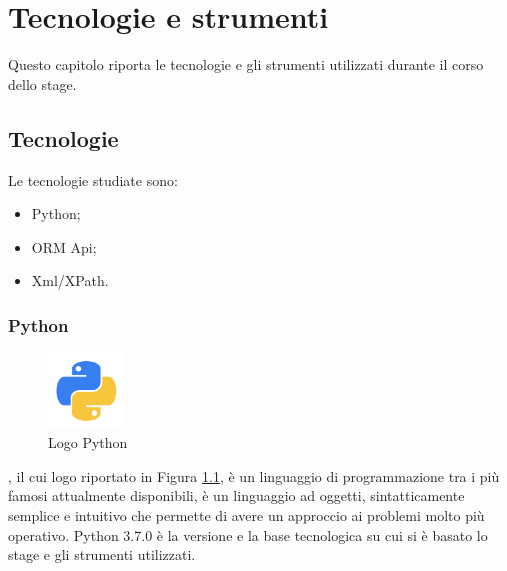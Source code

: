 
\hypertarget{(chap:capitolo6)}{}
\chapter{Tecnologie e strumenti}
Questo capitolo riporta le tecnologie e gli strumenti utilizzati durante il corso dello stage.
\section{Tecnologie}
Le tecnologie studiate sono:
\begin{itemize}
\item Python;
\item ORM Api;
\item Xml/XPath.
\end{itemize}
\subsection{Python}
\begin{figure}[H]
	\begin{center} \includegraphics[width=2cm]{figures/python}
		\caption[Logo Python]{Logo Python} 
		\label{logo_python} 
	\end{center}
\end{figure}
, il cui logo riportato in Figura \ref{logo_python}, è un linguaggio di programmazione tra i più famosi attualmente disponibili, è un linguaggio ad oggetti, sintatticamente semplice e intuitivo che permette di avere un approccio ai problemi molto più operativo. Python 3.7.0 è la versione e la base tecnologica su cui si è basato lo stage e gli strumenti utilizzati.

